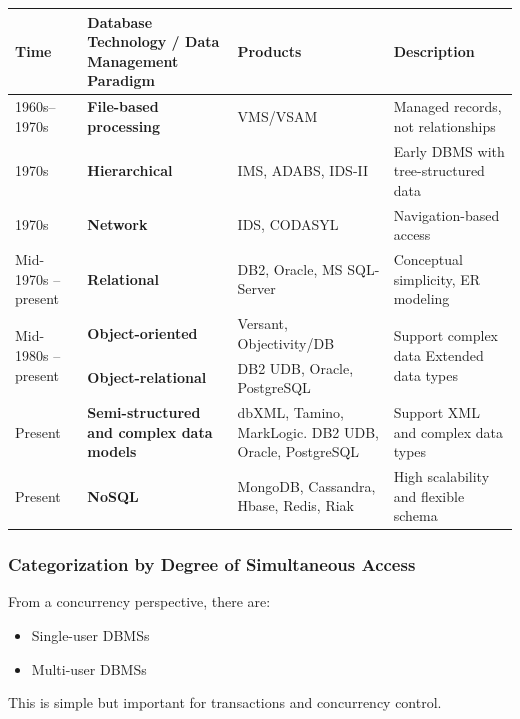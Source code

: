 \documentclass[11pt]{article}
\begin{document}
\begin{table}[ht]
    \centering
    \begin{tabular}{|p{2.2cm}|p{3.5cm}|p{3.5cm}|p{3.5cm}|}
        \hline
        \textbf{Time} & \textbf{Database Technology / Data Management Paradigm} & \textbf{Products} & \textbf{Description} \\ \hline
        1960s--1970s & \textbf{File-based processing} & VMS/VSAM & Managed records, not relationships \\ \hline
        1970s & \textbf{Hierarchical} & IMS, ADABS, IDS-II & Early DBMS with tree-structured data \\ \hline
        1970s & \textbf{Network} & IDS, CODASYL & Navigation-based access \\ \hline
        Mid-1970s -- present & \textbf{Relational} & DB2, Oracle, MS SQL-Server & Conceptual simplicity, ER modeling \\ \hline
        \multirow{2}{2.2cm}{Mid-1980s -- present} & \textbf{Object-oriented} & Versant, Objectivity/DB & \multirow{2}{3.5cm}{Support complex data Extended data types} \\ \cline{2-3}
        & \textbf{Object-relational} & DB2 UDB, Oracle, PostgreSQL & \\ \hline
        Present & \textbf{Semi-structured and complex data models} & dbXML, Tamino, MarkLogic. DB2 UDB, Oracle, PostgreSQL & Support XML and complex data types \\ \hline
        Present & \textbf{NoSQL} & MongoDB, Cassandra, Hbase, Redis, Riak & High scalability and flexible schema \\ \hline
    \end{tabular}
\end{table}

\vspace{11pt}
\subsubsection{Categorization by Degree of Simultaneous Access}
\vspace{11pt}

From a concurrency perspective, there are:
\begin{itemize}
    \item Single-user DBMSs
    \item Multi-user DBMSs
\end{itemize}

This is simple but important for transactions and concurrency control.
\end{document}
